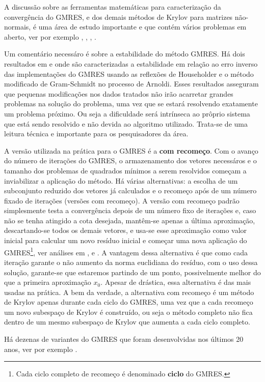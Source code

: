  A discussão  sobre as ferramentas matemáticas para caracterização da convergência do GMRES, e dos demais  métodos de Krylov para matrizes não-normais, é uma área de estudo importante e que contém vários problemas em aberto, ver por exemplo \cite{Embree1999How},  \cite{PaigeParlettEtAl95Approximate}, \cite{SimonciniSzyld2007Recent}, \cite{Zemke2003Krylov}.

 Um comentário necessáro  é sobre a estabilidade do método GMRES. Há dois resultados em \cite{PaigeRozloznikEtAl2006MODIFIED} e \cite{Rozloznik1997Numerical} onde são  caracterizadas a estabilidade em relação ao erro inverso das implementações do GMRES usando as reflexões de Householder e o método modificado de Gram-Schmidt no processo de Arnoldi. Esses resultados asseguram que pequenas modificações nos dados tratados não irão acarretar grandes problemas na solução do problema, uma vez que se estará  resolvendo exatamente um problema próximo. Ou seja a dificuldade será  intrínseca ao prôprio sistema que está sendo resolvido e não devida ao algoritmo utilizado. Trata-se de uma leitura  técnica e importante para os pesquisadores da área.



A versão  utilizada na prática para o GMRES é a \textbf{com recomeço}. Com o avanço do número de iterações do GMRES, o armazenamento dos vetores necessáros e o tamanho dos problemas de quadrados mínimos a serem resolvidos começam a inviabilizar a aplicação do  método. Há várias alternativas: a escolha de um subconjunto reduzido dos vetores já  calculados  e o recomeço após de um número fixado de iterações (versões com recomeço). A versão  com recomeço padrão simplesmente testa a convergência depois de um número fixo de iterações  e, caso não se tenha atingido a cota desejada, mantêm-se apenas a  última  aproximação, descartando-se todos os demais vetores,  e usa-se esse aproximação como valor inicial para calcular um novo  resíduo inicial e  começar uma nova aplicação do GMRES\footnote{Cada ciclo completo de recomeço é denominado \textbf{ciclo} do GMRES.}, ver análises em \cite{Morgan95Restarted}, \cite{Simoncini00Convergence} e \cite{Trefethen1990Algorithms}. A vantagem dessa alternativa é que como cada iteração garante o não aumento da norma euclidiana do  resíduo, com o uso dessa solução, garante-se que estaremos partindo de um ponto, possivelmente melhor do que a primeira aproximação $x_0$. Apesar de  drástica, essa alternativa é das mais usadas na prática. A bem da verdade, a alternativa com recomeço é um método de Krylov apenas durante cada ciclo do GMRES, uma vez que a cada recomeço um novo subespaço de Krylov é construído, ou seja o método completo não fica dentro de um mesmo subespaço de Krylov que aumenta a cada ciclo completo.

Há dezenas de variantes do  GMRES que foram desenvolvidas nos últimos 20 anos, ver por exemplo \cite{SaadVorst00Iterative,SimonciniSzyld2007Recent,Zou2023}.

